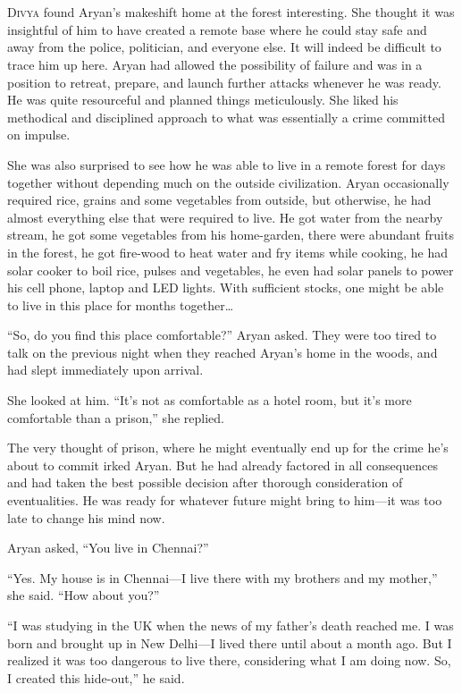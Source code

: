 \chapter{}

\lettrine{D}{ivya} found Aryan's makeshift home at the forest interesting. She thought it was
insightful of him to have created a remote base where he could stay safe and
away from the police, politician, and everyone else. It will indeed be difficult
to trace him up here. Aryan had allowed the possibility of failure and was in a
position to retreat, prepare, and launch further attacks whenever he was ready.
He was quite resourceful and planned things meticulously. She liked his
methodical and disciplined approach to what was essentially a crime committed on
impulse.

She was also surprised to see how he was able to live in a remote forest for
days together without depending much on the outside civilization. Aryan
occasionally required rice, grains and some vegetables from outside, but
otherwise, he had almost everything else that were required to live. He got
water from the nearby stream, he got some vegetables from his home-garden, there
were abundant fruits in the forest, he got fire-wood to heat water and fry items
while cooking, he had solar cooker to boil rice, pulses and vegetables, he even
had solar panels to power his cell phone, laptop and LED lights. With sufficient
stocks, one might be able to live in this place for months together…

“So, do you find this place comfortable?” Aryan asked. They were too tired to
talk on the previous night when they reached Aryan's home in the woods, and had
slept immediately upon arrival.

She looked at him. “It's not as comfortable as a hotel room, but it's more
comfortable than a prison,” she replied.

The very thought of prison, where he might eventually end up for the crime he's
about to commit irked Aryan. But he had already factored in all consequences and
had taken the best possible decision after thorough consideration of
eventualities. He was ready for whatever future might bring to him—it was too
late to change his mind now.

Aryan asked, “You live in Chennai?”

“Yes. My house is in Chennai—I live there with my brothers and my mother,” she
said. “How about you?”

“I was studying in the UK when the news of my father's death reached me. I was
born and brought up in New Delhi—I lived there until about a month ago. But I
realized it was too dangerous to live there, considering what I am doing now.
So, I created this hide-out,” he said.

